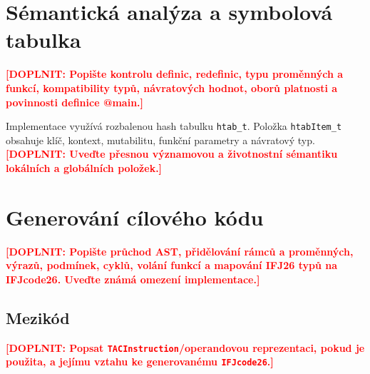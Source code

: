 \documentclass[11pt,a4paper]{article}
\newcommand{\placeholder}[1]{\textcolor{red}{\textbf{[DOPLNIT: #1]}}}
\begin{document}
\section{Sémantická analýza a symbolová tabulka}
\placeholder{Popište kontrolu definic, redefinic, typu proměnných a funkcí, kompatibility typů,
návratových hodnot, oborů platnosti a povinnosti definice @main.}

Implementace využívá rozbalenou hash tabulku \texttt{htab\_t}.
Položka \texttt{htabItem\_t} obsahuje klíč, kontext, mutabilitu, funkční parametry a návratový typ.
\placeholder{Uveďte přesnou významovou a životnostní sémantiku lokálních a globálních položek.}

\section{Generování cílového kódu}
\placeholder{Popište průchod AST, přidělování rámců a proměnných, výrazů, podmínek, cyklů,
volání funkcí a mapování IFJ26 typů na IFJcode26. Uveďte známá omezení implementace.}

\subsection{Mezikód}
\placeholder{Popsat \texttt{TACInstruction}/operandovou reprezentaci, pokud je použita, a jejímu vztahu ke generovanému \texttt{IFJcode26}.}
\end{document}
